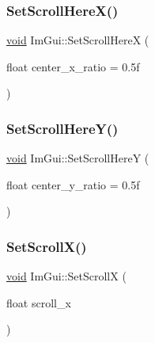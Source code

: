 \mbox{\label{namespaceImGui_a317a44e9126aa24099abc5cfc7d391ec}} 
\subsubsection{\texorpdfstring{Set\+Scroll\+Here\+X()}{SetScrollHereX()}}
{\footnotesize\ttfamily \hyperlink{imgui__impl__opengl3__loader_8h_ac668e7cffd9e2e9cfee428b9b2f34fa7}{void} Im\+Gui\+::\+Set\+Scroll\+HereX (\begin{DoxyParamCaption}\item[{float}]{center\+\_\+x\+\_\+ratio = {\ttfamily 0.5f} }\end{DoxyParamCaption})}

\mbox{\label{namespaceImGui_ac74487b4d75580ca637659103fef1368}} 
\subsubsection{\texorpdfstring{Set\+Scroll\+Here\+Y()}{SetScrollHereY()}}
{\footnotesize\ttfamily \hyperlink{imgui__impl__opengl3__loader_8h_ac668e7cffd9e2e9cfee428b9b2f34fa7}{void} Im\+Gui\+::\+Set\+Scroll\+HereY (\begin{DoxyParamCaption}\item[{float}]{center\+\_\+y\+\_\+ratio = {\ttfamily 0.5f} }\end{DoxyParamCaption})}

\mbox{\label{namespaceImGui_a0796750de8c50555d895f63e79ac87f0}} 
\subsubsection{\texorpdfstring{Set\+Scroll\+X()}{SetScrollX()}\hspace{0.1cm}{\footnotesize\ttfamily [1/2]}}
{\footnotesize\ttfamily \hyperlink{imgui__impl__opengl3__loader_8h_ac668e7cffd9e2e9cfee428b9b2f34fa7}{void} Im\+Gui\+::\+Set\+ScrollX (\begin{DoxyParamCaption}\item[{float}]{scroll\+\_\+x }\end{DoxyParamCaption})}

